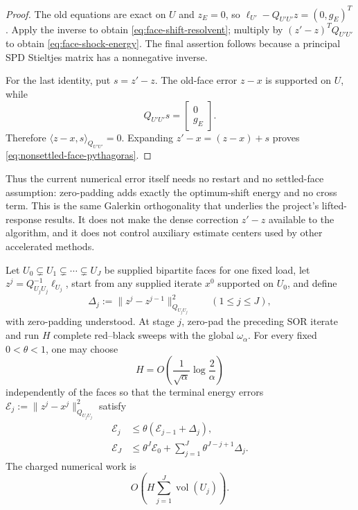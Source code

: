 \begin{proof}
The old equations are exact on $U$ and $z_E=0$, so
$\ell_{U'}-Q_{U'U'}z=(0,g_E)^T$.  Apply the inverse to obtain
\eqref{eq:face-shift-resolvent}; multiply by $(z'-z)^TQ_{U'U'}$ to obtain
\eqref{eq:face-shock-energy}.  The final assertion follows because a
principal SPD Stieltjes matrix has a nonnegative inverse.

For the last identity, put $s=z'-z$.  The old-face error $z-x$ is supported
on $U$, while
\begin{equation*}
 Q_{U'U'}s=\begin{bmatrix}0\\g_E\end{bmatrix}.
\end{equation*}
Therefore
$\langle z-x,s\rangle_{Q_{U'U'}}=0$.  Expanding
$z'-x=(z-x)+s$ proves \eqref{eq:nonsettled-face-pythagoras}.
\end{proof}

Thus the current numerical error itself needs no restart and no settled-face
assumption: zero-padding adds exactly the optimum-shift energy and no cross
term.  This is the same Galerkin orthogonality that underlies the project's
lifted-response results.  It does not make the dense correction $z'-z$
available to the algorithm, and it does not control auxiliary estimate
centers used by other accelerated methods.

\begin{proposition}
\label{prop:windowed-sor-continuation}
Let
$U_0\subsetneq U_1\subsetneq\cdots\subsetneq U_J$
be supplied bipartite faces for one fixed load, let
$z^j=Q_{U_jU_j}^{-1}\ell_{U_j}$, start from any supplied iterate $x^0$
supported on $U_0$, and define
\begin{equation*}
 \Delta_j:=
 \|z^j-z^{j-1}\|_{Q_{U_jU_j}}^2
 \qquad (1\leq j\leq J),
\end{equation*}
with zero-padding understood.  At stage $j$, zero-pad the preceding SOR
iterate and run $H$ complete red--black sweeps with the global
$\omega_\alpha$.  For every fixed $0<\theta<1$, one may choose
\begin{equation}
 H=O\!\left(
  \frac1{\sqrt\alpha}\log\frac2\alpha
 \right)
 \label{eq:generic-face-window-length}
\end{equation}
independently of the faces so that the terminal energy errors
$\mathcal E_j:=\|z^j-x^j\|_{Q_{U_jU_j}}^2$ satisfy
\begin{align}
 \mathcal E_j
 &\leq\theta(\mathcal E_{j-1}+\Delta_j),
 \label{eq:windowed-energy-recursion}\\
 \mathcal E_J
 &\leq\theta^J\mathcal E_0
 +\sum_{j=1}^J\theta^{J-j+1}\Delta_j.
 \label{eq:windowed-energy-telescope}
\end{align}
The charged numerical work is
\begin{equation}
 O\!\left(
  H\sum_{j=1}^J\operatorname{vol}(U_j)
 \right).
 \label{eq:windowed-face-scan-work}
\end{equation}
\end{proposition}

